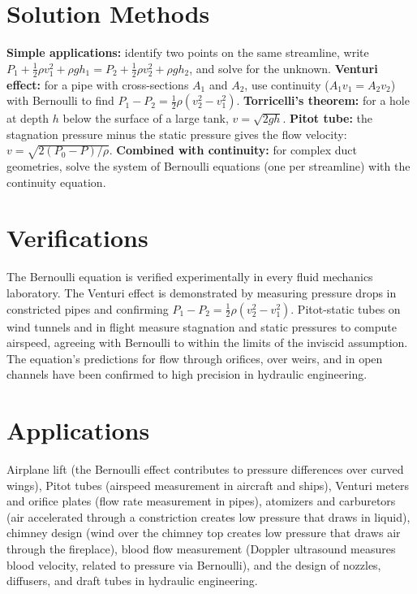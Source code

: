\documentclass[11pt,openright]{book}
\begin{document}
\section*{Solution Methods}

\textbf{Simple applications:} identify two points on the same streamline, write $P_1 + \frac{1}{2}\rho v_1^2 + \rho gh_1 = P_2 + \frac{1}{2}\rho v_2^2 + \rho gh_2$, and solve for the unknown. \textbf{Venturi effect:} for a pipe with cross-sections $A_1$ and $A_2$, use continuity ($A_1 v_1 = A_2 v_2$) with Bernoulli to find $P_1 - P_2 = \frac{1}{2}\rho(v_2^2 - v_1^2)$. \textbf{Torricelli's theorem:} for a hole at depth $h$ below the surface of a large tank, $v = \sqrt{2gh}$. \textbf{Pitot tube:} the stagnation pressure minus the static pressure gives the flow velocity: $v = \sqrt{2(P_0 - P)/\rho}$. \textbf{Combined with continuity:} for complex duct geometries, solve the system of Bernoulli equations (one per streamline) with the continuity equation.
\section*{Verifications}

The Bernoulli equation is verified experimentally in every fluid mechanics laboratory. The Venturi effect is demonstrated by measuring pressure drops in constricted pipes and confirming $P_1 - P_2 = \frac{1}{2}\rho(v_2^2 - v_1^2)$. Pitot-static tubes on wind tunnels and in flight measure stagnation and static pressures to compute airspeed, agreeing with Bernoulli to within the limits of the inviscid assumption. The equation's predictions for flow through orifices, over weirs, and in open channels have been confirmed to high precision in hydraulic engineering.
\section*{Applications}

Airplane lift (the Bernoulli effect contributes to pressure differences over curved wings), Pitot tubes (airspeed measurement in aircraft and ships), Venturi meters and orifice plates (flow rate measurement in pipes), atomizers and carburetors (air accelerated through a constriction creates low pressure that draws in liquid), chimney design (wind over the chimney top creates low pressure that draws air through the fireplace), blood flow measurement (Doppler ultrasound measures blood velocity, related to pressure via Bernoulli), and the design of nozzles, diffusers, and draft tubes in hydraulic engineering.
\end{document}
